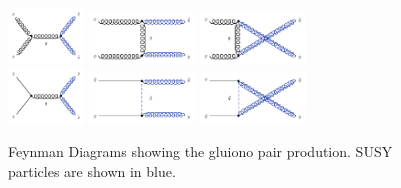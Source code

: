 \begin{figure}[!hb]
\centering
  \includegraphics[width=0.18\textwidth]{Plots/feyndiagrams/gluinoprod_sch1.pdf}
   \includegraphics[width=0.25\textwidth]{Plots/feyndiagrams/gluinoprod_tch1.pdf}
   \includegraphics[width=0.25\textwidth]{Plots/feyndiagrams/gluinoprod_uch1.pdf}
  \\
    \includegraphics[width=0.18\textwidth]{Plots/feyndiagrams/gluinoprod_sch2.pdf}
   \includegraphics[width=0.25\textwidth]{Plots/feyndiagrams/gluinoprod_tch2.pdf}
    \includegraphics[width=0.25\textwidth]{Plots/feyndiagrams/gluinoprod_uch2.pdf}

  \caption{\label{fig:gluProd}Feynman  Diagrams showing the gluiono pair prodution.
  SUSY particles are  shown in blue.
  }
\end{figure}
